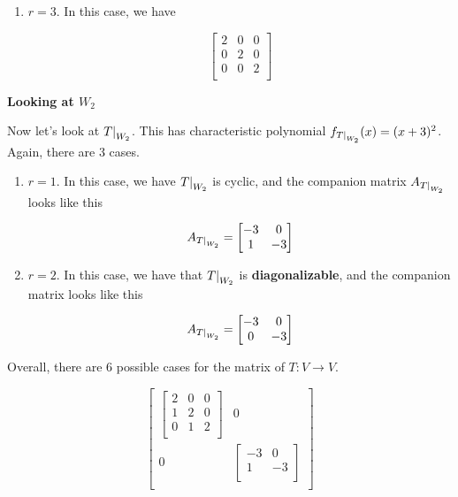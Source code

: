 \documentclass[12pt]{article}
\begin{document}
{\begin{enumerate}
      \item $r = 3$. In this case, we have 

        \[
          \begin{bmatrix}
            2 & 0 & 0 \\
            0 & 2 & 0 \\
            0 & 0 & 2 \\
          \end{bmatrix}
        \]
    \end{enumerate}

    {\bf Looking at $W_2$}

    Now let's look at $\restr{T}{W_2}$. This has characteristic polynomial
    $f_{\restr{T}{W_2}}(x) = (x + 3)^2$. Again, there are 3 cases.

    \begin{enumerate}
      \item $r = 1$. In this case, we have $\restr{T}{W_2}$ is cyclic, and the
        companion matrix $A_{\restr{T}{W_2}}$ looks like this

        \[
          A_{\restr{T}{W_2}}
          =
          \begin{bmatrix}
            -3 & 0 \\
            1 & -3 \\
          \end{bmatrix}
        \]

      \item $r = 2$. In this case, we have that $\restr{T}{W_2}$ is {\bf
        diagonalizable}, and the companion matrix looks like this

        \[
          A_{\restr{T}{W_2}}
          =
          \begin{bmatrix}
            -3 & 0 \\
            0 & -3 \\
          \end{bmatrix}
        \]
    \end{enumerate}

    Overall, there are 6 possible cases for the matrix of $T: V \to V$.

    \begin{multicols}{3}
      \[
        \begin{bmatrix}
          \begin{bmatrix}
            2 & 0 & 0\\
            1 & 2 & 0 \\
            0 & 1 & 2 \\
          \end{bmatrix} & 0 \\
          0 & \begin{bmatrix}
            -3 & 0 \\
            1 & -3 \\
          \end{bmatrix} \\
        \end{bmatrix}
      \]


\end{multicols}}
\end{document}
